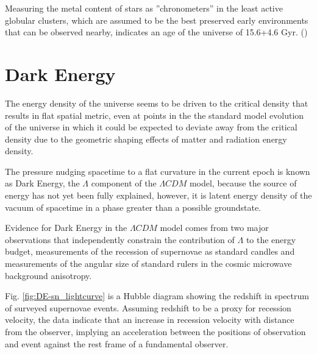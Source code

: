 \documentclass{paper}
\begin{document}
  Measuring the metal content of stars as ''chronometers'' in the least active 
  globular clusters, which are assumed to be the best preserved early 
  environments that can be observed nearby, indicates an age of the universe
  of 15.6+4.6 Gyr. %
  (\cite{1999ApJ...521..194C})

\section{Dark Energy}
  The energy density of the universe seems to be driven to the critical 
  density that results in flat spatial metric, even at points in the
  the standard model evolution of the universe in which it could be expected
  to deviate away from the critical density due to the geometric shaping 
  effects of matter and radiation energy density.

  The pressure nudging spacetime to a flat curvature in the current epoch is 
  known as Dark Energy, the \(\Lambda\) component of the \(\Lambda CDM\)
  model, because the source of energy has not yet been fully explained, 
  however, it is latent energy density of the vacuum of spacetime in a phase
  greater than a possible groundstate.

  Evidence for Dark Energy in the \(\Lambda CDM\) model comes from two major
  observations that independently constrain the contribution of \(\Lambda\) 
  to the energy budget, measurements of the recession of supernovae as 
  standard candles and measurements of the angular size of standard rulers in 
  the cosmic microwave background anisotropy.

  Fig. \ref{fig:DE-sn_lightcurve} is a Hubble diagram showing the redshift in
  spectrum of surveyed supernovae events. Assuming redshift to be a proxy for
  recession velocity, the data indicate that an increase in recession 
  velocity with distance from the observer, implying an acceleration between
  the positions of observation and event against the rest frame of a
  fundamental observer.
\end{document}
